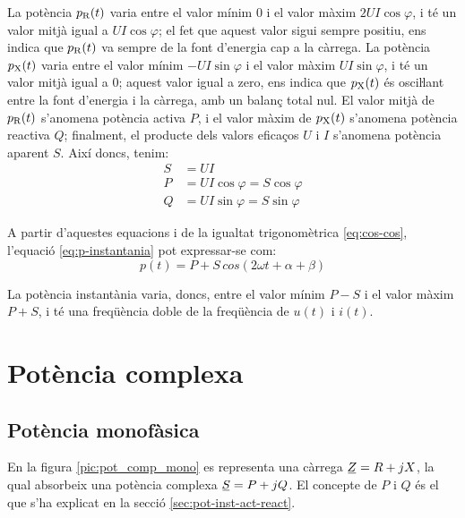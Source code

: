 La potència $p_\mathrm{R}(t)$ varia entre el valor mínim 0 i el valor màxim $2 U I \cos\varphi$,
i té un valor mitjà igual a $U I \cos\varphi$; el fet que aquest valor sigui sempre positiu,
ens indica que $p_\mathrm{R}(t)$  va sempre de la font d'energia cap a la càrrega.
La potència $p_\mathrm{X}(t)$ varia entre el valor mínim $-U I \sin\varphi$ i el valor
màxim $U I \sin\varphi$, i té un valor mitjà igual a 0; aquest valor igual a zero,
ens indica que $p_\mathrm{X}(t)$ és osciŀlant entre la font d'energia i la càrrega,
amb un balanç total nul. El valor mitjà de $p_\mathrm{R}(t)$ s'anomena potència activa $P$, i el
valor màxim de $p_\mathrm{X}(t)$ s'anomena potència reactiva $Q$; finalment, el producte dels valors
eficaços $U$ i $I$ s'anomena potència aparent $S$. Així doncs, tenim:
\begin{align}
  S &= U I \\
  P &= U I \cos\varphi = S \cos\varphi\\
  Q &= U I \sin\varphi = S \sin\varphi
\end{align}

A partir d'aquestes equacions i de la igualtat trigonomètrica \eqref{eq:cos-cos}, l'equació \eqref{eq:p-instantania} pot expressar-se com:
\begin{equation}
	p(t) = P + S \,cos(2 \omega t + \alpha +  \beta)
\end{equation}

La potència instantània varia, doncs, entre el valor mínim $P - S$ i el valor màxim $P + S$, i té una freqüència doble de la freqüència de $u(t)$ i $i(t)$.

\section{Potència complexa}\label{sec:pot_complex} 

\subsection{Potència monofàsica} \label{sec:pot-monof}

En la figura \vref{pic:pot_comp_mono} es representa una càrrega $\cmplx{Z}=R+j X$, la
qual absorbeix una potència complexa $\cmplx{S} = P + j Q$. El concepte de $P$ i $Q$ és el  que s'ha explicat en la secció \ref{sec:pot-inst-act-react}.
\begin{center}
    
    \label{pic:pot_comp_mono}
\end{center}

